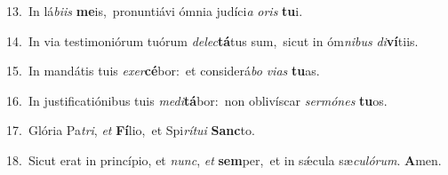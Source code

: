 {\numbfont\textcolor{\numbcolor}{13.}}~In lá\-\textit{bi}\-\textit{is} \textbf{me}\-is,~\star pronuntiávi ómnia judíci\textit{a} \textit{o}\-\textit{ris} \textbf{tu}\-i.\par
{\numbfont\textcolor{\numbcolor}{14.}}~In via testimoniórum tuórum \textit{de}\-\textit{lec}\textbf{tá}tus sum,~\star sicut in óm\-\textit{ni}\-\textit{bus} \textit{di}\-\textbf{ví}tiis.\par
{\numbfont\textcolor{\numbcolor}{15.}}~In mandátis tuis \textit{ex}\-\textit{er}\textbf{cé}bor:~\star et considerá\textit{bo} \textit{vi}\-\textit{as} \textbf{tu}\-as.\par
{\numbfont\textcolor{\numbcolor}{16.}}~In justificatiónibus tuis \textit{me}\-\textit{di}\textbf{tá}bor:~\star non oblivíscar \textit{ser}\-\textit{mó}\textit{nes} \textbf{tu}\-os.\par
{\numbfont\textcolor{\numbcolor}{17.}}~Glória Pa\-\textit{tri}\-, \textit{et} \textbf{Fí}\-lio,~\star et Spi\-\textit{rí}\-\textit{tu}\textit{i} \textbf{Sanc}\-to.\par
{\numbfont\textcolor{\numbcolor}{18.}}~Sicut erat in princípio, et \textit{nunc}\-, \textit{et} \textbf{sem}\-per,~\star et in sǽcula sæ\-\textit{cu}\-\textit{ló}\textit{rum}. \textbf{A}\-men.\par
